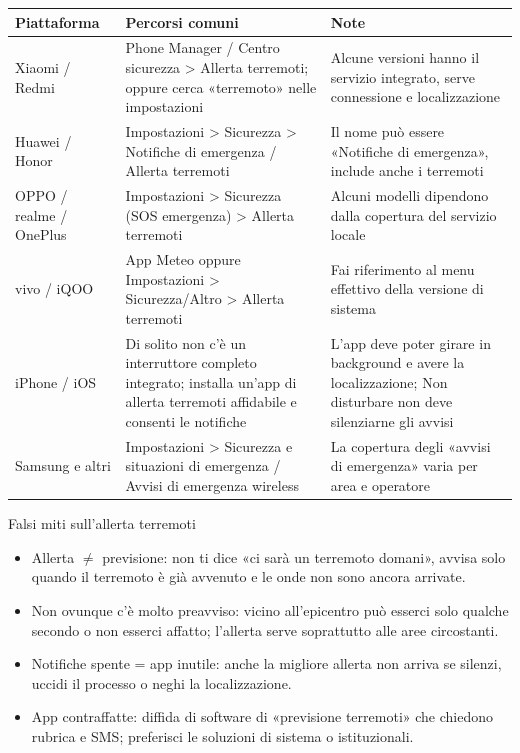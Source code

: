 \begin{center}
\begin{tabularx}{\linewidth}{|X|X|X|}
\hline
\textbf{Piattaforma} & \textbf{Percorsi comuni} & \textbf{Note} \tabularnewline
\hline
Xiaomi / Redmi & Phone Manager / Centro sicurezza > Allerta terremoti; oppure cerca «terremoto» nelle impostazioni & Alcune versioni hanno il servizio integrato, serve connessione e localizzazione \tabularnewline
Huawei / Honor & Impostazioni > Sicurezza > Notifiche di emergenza / Allerta terremoti & Il nome può essere «Notifiche di emergenza», include anche i terremoti \tabularnewline
OPPO / realme / OnePlus & Impostazioni > Sicurezza (SOS emergenza) > Allerta terremoti & Alcuni modelli dipendono dalla copertura del servizio locale \tabularnewline
vivo / iQOO & App Meteo oppure Impostazioni > Sicurezza/Altro > Allerta terremoti & Fai riferimento al menu effettivo della versione di sistema \tabularnewline
iPhone / iOS & Di solito non c'è un interruttore completo integrato; installa un'app di allerta terremoti affidabile e consenti le notifiche & L'app deve poter girare in background e avere la localizzazione; Non disturbare non deve silenziarne gli avvisi \tabularnewline
Samsung e altri & Impostazioni > Sicurezza e situazioni di emergenza / Avvisi di emergenza wireless & La copertura degli «avvisi di emergenza» varia per area e operatore \tabularnewline
\hline
\end{tabularx}
\end{center}

\begin{tcbwarn}{Falsi miti sull'allerta terremoti}
\begin{itemize}
  \item Allerta $\neq$ previsione: non ti dice «ci sarà un terremoto domani», avvisa solo quando il terremoto è già avvenuto e le onde non sono ancora arrivate.
  \item Non ovunque c'è molto preavviso: vicino all'epicentro può esserci solo qualche secondo o non esserci affatto; l'allerta serve soprattutto alle aree circostanti.
  \item Notifiche spente = app inutile: anche la migliore allerta non arriva se silenzi, uccidi il processo o neghi la localizzazione.
  \item App contraffatte: diffida di software di «previsione terremoti» che chiedono rubrica e SMS; preferisci le soluzioni di sistema o istituzionali.
\end{itemize}

\end{tcbwarn}

